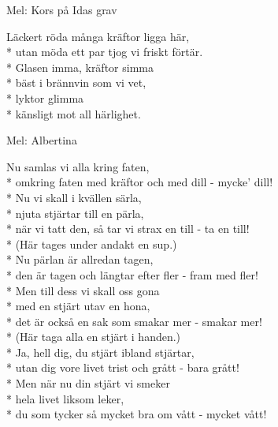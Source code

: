 \begin{SongText}
    \begin{SongInfo}
        Mel: Kors på Idas grav
    \end{SongInfo}
    \begin{SongVerse}
        Läckert röda många kräftor ligga här,\\*%
        utan möda ett par tjog vi friskt förtär.\\*%
        Glasen imma, kräftor simma\\*%
        bäst i brännvin som vi vet,\\*%
        lyktor glimma\\*%
        känsligt mot all härlighet.
    \end{SongVerse}
\end{SongText}
\begin{SongText}
    \begin{SongInfo}
        Mel: Albertina
    \end{SongInfo}
    \begin{SongVerse}
        Nu samlas vi alla kring faten,\\*%
        omkring faten med kräftor och med dill - mycke’ dill!\\*%
        Nu vi skall i kvällen särla,\\*%
        njuta stjärtar till en pärla,\\*%
        när vi tatt den, så tar vi strax en till - ta en till!\\*%
        (Här tages under andakt en sup.)\\*%
        Nu pärlan är allredan tagen,\\*%
        den är tagen och längtar efter fler - fram med fler!\\*%
        Men till dess vi skall oss gona\\*%
        med en stjärt utav en hona,\\*%
        det är också en sak som smakar mer - smakar mer!\\*%
        (Här taga alla en stjärt i handen.)\\*%
        Ja, hell dig, du stjärt ibland stjärtar,\\*%
        utan dig vore livet trist och grått - bara grått!\\*%
        Men när nu din stjärt vi smeker\\*%
        hela livet liksom leker,\\*%
        du som tycker så mycket bra om vått - mycket vått!
    \end{SongVerse}
\end{SongText}
